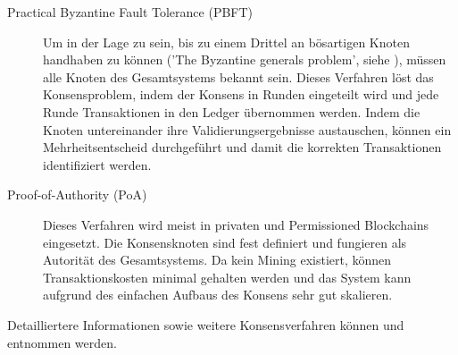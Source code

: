 \begin{description}
  \item[Practical Byzantine Fault Tolerance (PBFT)] Um in der Lage zu sein, bis zu einem Drittel an bösartigen Knoten handhaben zu können ('The Byzantine generals problem', siehe \cite{byzantine2019}), müssen alle Knoten des Gesamtsystems bekannt sein. Dieses Verfahren löst das Konsensproblem, indem der Konsens in Runden eingeteilt wird und jede Runde Transaktionen in den Ledger übernommen werden. Indem die Knoten untereinander ihre Validierungsergebnisse austauschen, können ein Mehrheitsentscheid durchgeführt und damit die korrekten Transaktionen identifiziert werden. \cite{Salimitari2018ASO}
  \item[Proof-of-Authority (PoA)] Dieses Verfahren wird meist in privaten und Permissioned Blockchains eingesetzt. Die Konsensknoten sind fest definiert und fungieren als Autorität des Gesamtsystems. Da kein Mining existiert, können Transaktionskosten minimal gehalten werden und das System kann aufgrund des einfachen Aufbaus des Konsens sehr gut skalieren. \cite{Salimitari2018ASO}
\end{description}
Detailliertere Informationen sowie weitere Konsensverfahren können \cite{overview2017} und \cite{consensusIOT2018} entnommen werden.


